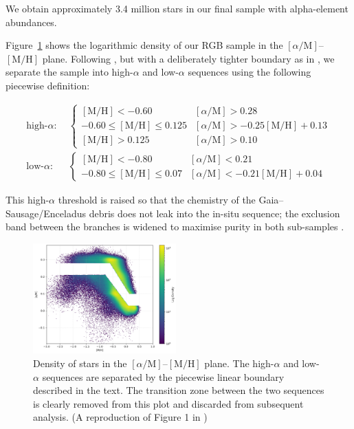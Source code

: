 \documentclass[a4paper,12pt]{article}
\begin{document}
We obtain approximately 3.4 million stars in our final sample with alpha-element abundances.

Figure~\ref{fig:alphametal} shows the logarithmic density of our
RGB sample in the $[\alpha/\mathrm{M}]$–$[\mathrm{M/H}]$ plane.
Following \citet{Chandra_2024}, but with a deliberately tighter boundary as in \citet{Vis2024}, we separate
the sample into high-$\alpha$ and low-$\alpha$ sequences using the following piecewise definition:

\[
\begin{aligned}
\text{high-}\alpha:\;&
  \begin{cases}
    [\mathrm{M/H}] < -0.60 &
      [\alpha/\mathrm{M}] > 0.28 \\
    -0.60 \le [\mathrm{M/H}] \le 0.125 &
      [\alpha/\mathrm{M}] > -0.25[\mathrm{M/H}] + 0.13 \\
    [\mathrm{M/H}] > 0.125 &
      [\alpha/\mathrm{M}] > 0.10
  \end{cases} \\[4pt]
\text{low-}\alpha:\;&
  \begin{cases}
    [\mathrm{M/H}] < -0.80 &
      [\alpha/\mathrm{M}] < 0.21 \\
    -0.80 \le [\mathrm{M/H}] \le 0.07 &
      [\alpha/\mathrm{M}] < -0.21[\mathrm{M/H}] + 0.04
  \end{cases}
\end{aligned}
\]

This high-$\alpha$ threshold is raised so that the
chemistry of the Gaia–Sausage/Enceladus debris
\citep{Belokurov2018,Helmi2018} does not leak into the
in-situ sequence; the exclusion band between the branches is widened to maximise purity
in both sub-samples \citep{Vis2024}.

\begin{figure}[H]
    \centering
    \includegraphics[width=0.49\textwidth]{../figures/alpha_vs_metalicity.png}
    \caption{Density of stars in the $[\alpha/\mathrm{M}]$–$[\mathrm{M/H}]$ plane.
             The high-$\alpha$ and low-$\alpha$ sequences are separated by the
             piecewise linear boundary described in the text. The transition zone
             between the two sequences is clearly removed from this plot and discarded from
             subsequent analysis. (A reproduction of Figure 1 in \citet{Vis2024})}
    \label{fig:alphametal}
\end{figure}
\end{document}
